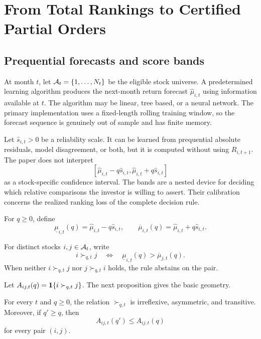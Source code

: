 \section{From Total Rankings to Certified Partial Orders}
\label{sec:ranking}

\subsection{Prequential forecasts and score bands}

At month $t$, let $\mathcal A_t=\{1,\ldots,N_t\}$ be the eligible stock universe. A predetermined learning algorithm produces the next-month return forecast $\widehat\mu_{i,t}$ using information available at $t$. The algorithm may be linear, tree based, or a neural network. The primary implementation uses a fixed-length rolling training window, so the forecast sequence is genuinely out of sample and has finite memory.

Let $\widehat s_{i,t}>0$ be a reliability scale. It can be learned from prequential absolute residuals, model disagreement, or both, but it is computed without using $R_{i,t+1}$. The paper does not interpret
\[
[\widehat\mu_{i,t}-q\widehat s_{i,t},
  \widehat\mu_{i,t}+q\widehat s_{i,t}]
\]
as a stock-specific confidence interval. The bands are a nested device for deciding which relative comparisons the investor is willing to assert. Their calibration concerns the realized ranking loss of the complete decision rule.

For $q\geq0$, define
\begin{equation}
\underline\mu_{i,t}(q)
=
\widehat\mu_{i,t}-q\widehat s_{i,t},
\qquad
\overline\mu_{i,t}(q)
=
\widehat\mu_{i,t}+q\widehat s_{i,t}.
\label{eq:bands}
\end{equation}

\begin{definition}
For distinct stocks $i,j\in\mathcal A_t$, write
\begin{equation}
i\succ_{q,t}j
\quad\Longleftrightarrow\quad
\underline\mu_{i,t}(q)
>
\overline\mu_{j,t}(q).
\label{eq:relation}
\end{equation}
When neither $i\succ_{q,t}j$ nor $j\succ_{q,t}i$ holds, the rule abstains on the pair.
\end{definition}

Let $A_{ij,t}(q)=\mathbf 1\{i\succ_{q,t}j\}$. The next proposition gives the basic geometry.

\begin{proposition}
\label{prop:partial-order}
For every $t$ and $q\geq0$, the relation $\succ_{q,t}$ is irreflexive, asymmetric, and transitive. Moreover, if $q'\geq q$, then
\[
A_{ij,t}(q')
\leq
A_{ij,t}(q)
\]
for every pair $(i,j)$.
\end{proposition}

